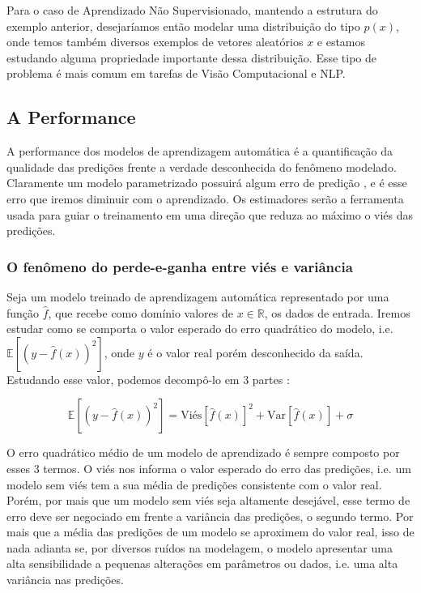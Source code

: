 Para o caso de Aprendizado Não Supervisionado, mantendo a estrutura do exemplo
anterior, desejaríamos então modelar uma distribuição do tipo $p(x)$, onde temos
também diversos exemplos de vetores aleatórios $x$ e estamos estudando alguma
propriedade importante dessa distribuição.
Esse tipo de problema é mais comum em tarefas de Visão Computacional e NLP.



\subsection{A Performance}
\label{sec:metricas}

A performance dos modelos de aprendizagem automática é a quantificação da
qualidade das predições frente a verdade desconhecida do fenômeno modelado.
Claramente um modelo parametrizado possuirá algum erro de predição \cite{dlbook}, e é esse
erro que iremos diminuir com o aprendizado. Os estimadores serão a ferramenta
usada para guiar o treinamento em uma direção que reduza ao máximo o viés das predições.

\subsubsection{O fenômeno do perde-e-ganha entre viés e variância}

Seja um modelo treinado de aprendizagem automática representado por uma função
$\hat{f}$, que recebe como domínio valores de $x \in \mathbb{R}$, os dados de
entrada. Iremos estudar como se comporta o valor esperado do erro quadrático do
modelo, i.e. $\mathbb{E}[(y - \hat{f}(x))^2]$, onde $y$ é o valor real porém
desconhecido da saída. Estudando esse valor, podemos decompô-lo em
3 partes \citep{mlprob}:

\[
  \mathbb{E}[(y - \hat{f}(x))^2] = \text{Viés}[\hat{f}(x)]^2 +
  \text{Var}[\hat{f}(x)] + \sigma 
\]

O erro quadrático médio de um modelo de aprendizado
é sempre composto por esses 3 termos. O viés nos informa o valor esperado do
erro das predições, i.e. um modelo sem viés tem a sua média de predições
consistente com o valor real. Porém, por mais que um modelo sem viés seja
altamente desejável, esse termo de erro deve ser negociado em frente a variância
das predições, o segundo termo. Por mais que a média das predições de um modelo
se aproximem do valor real, isso de nada adianta se, por diversos ruídos na
modelagem, o modelo apresentar uma alta sensibilidade a pequenas alterações em
parâmetros ou dados, i.e. uma alta variância nas predições.

